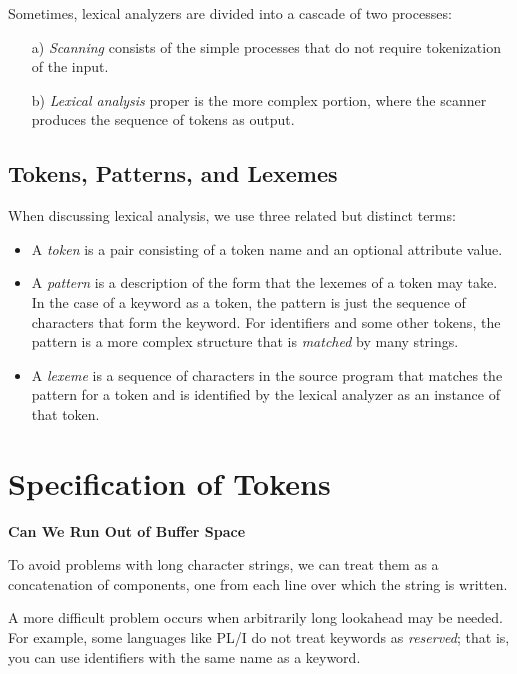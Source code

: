\documentclass[a4paper,twoside]{book}
\begin{document}
Sometimes, lexical analyzers are divided into a cascade of two processes:
\begin{itemize}
    \item[a)]\textit{Scanning} consists of the simple processes that do not require tokenization of the input.
    \item[b)]\textit{Lexical analysis} proper is the more complex portion, where the scanner produces the sequence of tokens as output.
\end{itemize}

\subsection{Tokens, Patterns, and Lexemes}

When discussing lexical analysis, we use three related but distinct terms:
\begin{itemize}
    \item A \textit{token} is a pair consisting of a token name and an optional attribute value.
    \item A \textit{pattern} is a description of the form that the lexemes of a token may take. In the case of a keyword as a token, the pattern is just the sequence of characters that form the keyword. For identifiers and some other tokens, the pattern is a more complex structure that is \textit{matched} by many strings.
    \item A \textit{lexeme}  is a sequence of characters in the source program that matches the pattern for a token and is identified by the lexical analyzer as an instance of that token.
\end{itemize}

\section{Specification of Tokens}

\begin{framed}
    \begin{center}
        \textbf{{\large Can We Run Out of Buffer Space}}
    \end{center}

    To avoid problems with long character strings, we can treat them as a concatenation of components, one from each line over which the string is written.

    A more difficult problem occurs when arbitrarily long lookahead may be needed. For example, some languages like PL/I do not treat keywords as \textit{reserved}; that is, you can use identifiers with the same name as a keyword.
\end{framed}
\end{document}
